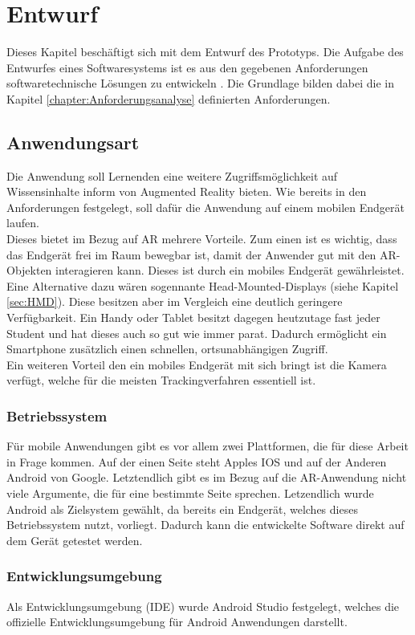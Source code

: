 \chapter{Entwurf}\label{chapter:entwurf}
Dieses Kapitel beschäftigt sich mit dem Entwurf des Prototyps. Die Aufgabe des Entwurfes eines Softwaresystems ist es aus den gegebenen Anforderungen softwaretechnische Lösungen zu entwickeln \citep{balzert:softwaretechnik}. Die Grundlage bilden dabei die in Kapitel \ref{chapter:Anforderungsanalyse} definierten Anforderungen.

\section{Anwendungsart}
Die Anwendung soll Lernenden eine weitere Zugriffsmöglichkeit auf Wissensinhalte inform von Augmented Reality bieten.
Wie bereits in den Anforderungen festgelegt, soll dafür die Anwendung auf einem mobilen Endgerät laufen.\\
Dieses bietet im Bezug auf AR mehrere Vorteile. Zum einen ist es wichtig, dass das Endgerät frei im Raum bewegbar ist, damit der Anwender gut mit den AR-Objekten interagieren kann. Dieses ist durch ein mobiles Endgerät gewährleistet. Eine Alternative dazu wären sogennante Head-Mounted-Displays (siehe Kapitel \ref{sec:HMD}). Diese besitzen aber im Vergleich eine deutlich geringere Verfügbarkeit. Ein Handy oder Tablet besitzt dagegen heutzutage fast jeder Student und hat dieses auch so gut wie immer parat. Dadurch ermöglicht ein Smartphone zusätzlich einen schnellen, ortsunabhängigen Zugriff. \\
Ein weiteren Vorteil den ein mobiles Endgerät mit sich bringt ist die Kamera verfügt, welche für die meisten Trackingverfahren essentiell ist. \\
\subsection{Betriebssystem}
Für mobile Anwendungen gibt es vor allem zwei Plattformen, die für diese Arbeit in Frage kommen. Auf der einen Seite steht Apples IOS und auf der Anderen Android von Google. Letztendlich gibt es im Bezug auf die AR-Anwendung nicht viele Argumente, die für eine bestimmte Seite sprechen. Letzendlich wurde Android als Zielsystem gewählt, da bereits ein Endgerät, welches dieses Betriebssystem nutzt, vorliegt. Dadurch kann die entwickelte Software direkt auf dem Gerät getestet werden. 

\subsection{Entwicklungsumgebung}
Als Entwicklungsumgebung (IDE) wurde Android Studio festgelegt, welches die offizielle Entwicklungsumgebung für Android Anwendungen darstellt. 

